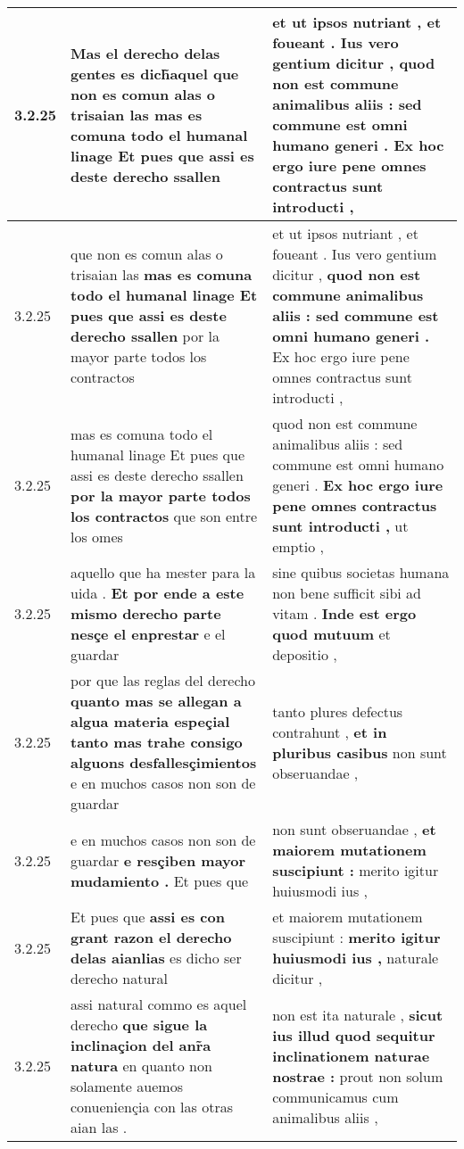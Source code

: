 \begin{tabular}{|p{1cm}|p{6.5cm}|p{6.5cm}|}
3.2.25 & Mas el derecho delas gentes es dich̃aquel \textbf{ que non es comun alas o trisaian las } mas es comuna todo el humanal linage Et pues que assi es deste derecho ssallen & et ut ipsos nutriant , et foueant . Ius vero gentium dicitur , \textbf{ quod non est commune animalibus aliis : sed commune est omni humano generi . } Ex hoc ergo iure pene omnes contractus sunt introducti , \\\hline
3.2.25 & que non es comun alas o trisaian las \textbf{ mas es comuna todo el humanal linage Et pues que assi es deste derecho ssallen } por la mayor parte todos los contractos & et ut ipsos nutriant , et foueant . Ius vero gentium dicitur , \textbf{ quod non est commune animalibus aliis : sed commune est omni humano generi . } Ex hoc ergo iure pene omnes contractus sunt introducti , \\\hline
3.2.25 & mas es comuna todo el humanal linage Et pues que assi es deste derecho ssallen \textbf{ por la mayor parte todos los contractos } que son entre los omes & quod non est commune animalibus aliis : sed commune est omni humano generi . \textbf{ Ex hoc ergo iure pene omnes contractus sunt introducti , } ut emptio , \\\hline
3.2.25 & aquello que ha mester para la uida . \textbf{ Et por ende a este mismo derecho parte nesçe el enprestar } e el guardar & sine quibus societas humana non bene sufficit sibi ad vitam . \textbf{ Inde est ergo quod mutuum } et depositio , \\\hline
3.2.25 & por que las reglas del derecho \textbf{ quanto mas se allegan a algua materia espeçial tanto mas trahe consigo alguons desfallesçimientos } e en muchos casos non son de guardar & tanto plures defectus contrahunt , \textbf{ et in pluribus casibus } non sunt obseruandae , \\\hline
3.2.25 & e en muchos casos non son de guardar \textbf{ e resçiben mayor mudamiento . } Et pues que & non sunt obseruandae , \textbf{ et maiorem mutationem suscipiunt : } merito igitur huiusmodi ius , \\\hline
3.2.25 & Et pues que \textbf{ assi es con grant razon el derecho delas aianlias } es dicho ser derecho natural & et maiorem mutationem suscipiunt : \textbf{ merito igitur huiusmodi ius , } naturale dicitur , \\\hline
3.2.25 & assi natural commo es aquel derecho \textbf{ que sigue la inclinaçion del anr̃a natura } en quanto non solamente auemos conueniençia con las otras aian las . & non est ita naturale , \textbf{ sicut ius illud quod sequitur inclinationem naturae nostrae : } prout non solum communicamus cum animalibus aliis , \\\hline

\end{tabular}
